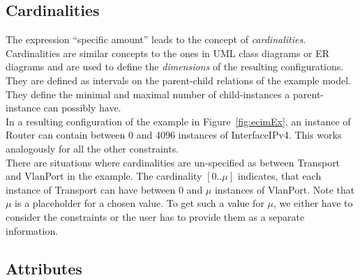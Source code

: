 \subsection{Cardinalities}\label{subsec:card}

The expression ``specific amount'' leads to the concept of \emph{cardinalities}. Cardinalities are similar concepts to the ones in UML class diagrams or ER diagrams and are used to define the \emph{dimensions} of the resulting configurations. They are defined as intervals on the parent-child relations of the example model. They define the minimal and maximal number of child-instances a parent-instance can possibly have. \\
In a resulting configuration of the example in Figure~\ref{fig:ecimEx}, an instance of \textsf{Router} can contain between 0 and 4096 instances of \textsf{InterfaceIPv4}. This works analogously for all the other constraints.\\

There are situations where cardinalities are un-specified as between \textsf{Transport} and \textsf{VlanPort} in the example. The cardinality $[0..\mu]$ indicates, that each instance of \textsf{Transport} can have between 0 and $\mu$ instances of \textsf{VlanPort}. Note that $\mu$ is a placeholder for a chosen value. To get such a value for $\mu$, we either have to consider the constraints or the user has to provide them as a separate information.

\subsection{Attributes}\label{subsec:attr}

